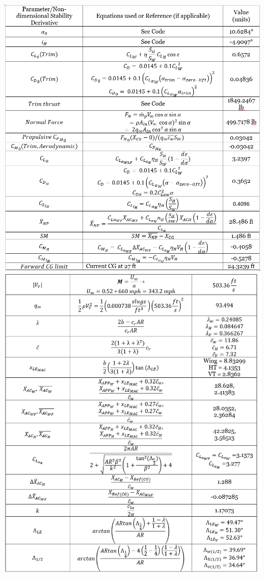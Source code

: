 \documentclass[a4paper, twoside]{article}
\begin{document}
\begin{center}
\includegraphics[width=\linewidth]{table-1.png}
\pagebreak
\includegraphics[width=\linewidth]{table-1-1.png}
\end{center}
\end{document}
